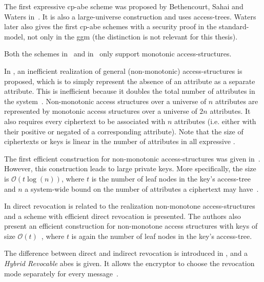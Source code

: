 The first expressive \acrshort{cp-abe} scheme was proposed by Bethencourt, Sahai and Waters in~\cite{bethencourt_ciphertext-policy_2007}.
It is also a large-universe construction and uses \glspl{access-tree}.
Waters \cite{waters_ciphertext-policy_2011} later also gives the first \acrshort{cp-abe} schemes with a security proof in the \gls{standard-model}, not only in the \gls{ggm} (the distinction is not relevant for this thesis).

Both the schemes in~\cite{goyal_attribute-based_2006} and in~\cite{bethencourt_ciphertext-policy_2007} only support monotonic \glspl{access-structure}.

In \cite{goyal_attribute-based_2006}, an inefficient realization of general (non-monotonic) \glspl{access-structure} is proposed, which is to simply represent the absence of an attribute as a separate attribute.
This is inefficient because it doubles the total number of attributes in the system~\cite{goyal_attribute-based_2006}. 
Non-monotonic access structures over a universe of $n$ attributes are represented by monotonic access structures over a universe of $2n$ attributes.
It also requires every ciphertext to be associated with $n$ attributes (i.e. either with their positive or negated of a corresponding attribute).
Note that the size of ciphertexts or keys is linear in the number of attributes in all expressive . %

The first efficient construction for non-monotonic \glspl{access-structure} was given in~\cite{ostrovsky_attribute-based_2007}. 
However, this construction leads to large private keys.
More specifically, the size is $\mathcal{O}(t \log(n))$, where $t$ is the number of leaf nodes in the key's \gls{access-tree} and $n$ a system-wide bound on the number of attributes a ciphertext may have~\cite{lewko_revocation_2008}. %

In \cite{lewko_revocation_2008} direct revocation is related to the realization non-monotone \glspl{access-structure} and a scheme with efficient direct revocation is presented.
The authors also present an efficient construction for non-monotone access structures with keys of size $\mathcal{O}(t)$~\cite{lewko_revocation_2008}, where $t$ is again the number of leaf nodes in the key's \gls{access-tree}.

The difference between direct and indirect revocation is introduced in \cite{attrapadung_attribute-based_2009}, and a \emph{Hybrid Revocable} \acrshort{abes} is given.
It allows the encryptor to choose the revocation mode separately for every message~\cite{attrapadung_attribute-based_2009}.

